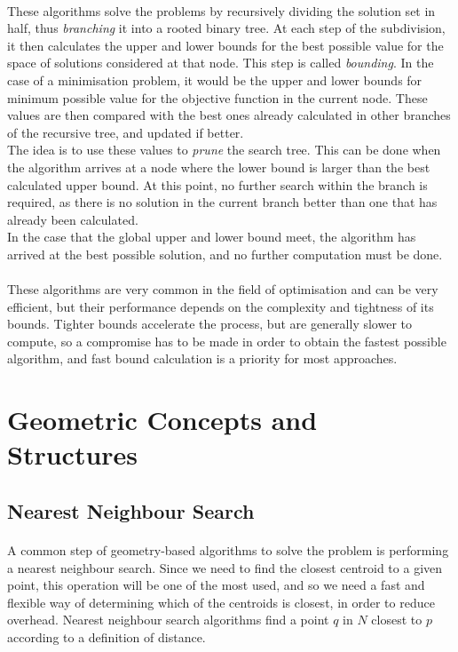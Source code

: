 \paragraph{}
These algorithms solve the problems by recursively dividing the solution set in half, thus \textit{branching} it into a rooted binary tree. At each step of the subdivision, it then calculates the upper and lower bounds for the best possible value for the space of solutions considered at that node. This step is called \textit{bounding}.
In the case of a minimisation problem, it would be the upper and lower bounds for minimum possible value for the objective function in the current node. These values are then compared with the best ones already calculated in other branches of the recursive tree, and updated if better.\\
The idea is to use these values to \textit{prune} the search tree. This can be done when the algorithm arrives at a node where the lower bound is larger than the best calculated upper bound. At this point, no further search within the branch is required, as there is no solution in the current branch better than one that has already been calculated. \\
In the case that the global upper and lower bound meet, the algorithm has arrived at the best possible solution, and no further computation must be done.

\paragraph{}
These algorithms are very common in the field of optimisation and can be very efficient, but their performance depends on the complexity and tightness of its bounds. Tighter bounds accelerate the process, but are generally slower to compute, so a compromise has to be made in order to obtain the fastest possible algorithm, and fast bound calculation is a priority for most approaches.

\section{Geometric Concepts and Structures}
\subsection{Nearest Neighbour Search}
\paragraph{}
A common step of geometry-based algorithms to solve the problem is performing a nearest neighbour search. Since we need to find the closest centroid to a given point, this operation will be one of the most used, and  so we need a fast and flexible way of determining which of the centroids is closest, in order to reduce overhead. Nearest neighbour search algorithms find a point $q$ in $N$ closest to $p$ according to a definition of distance.
